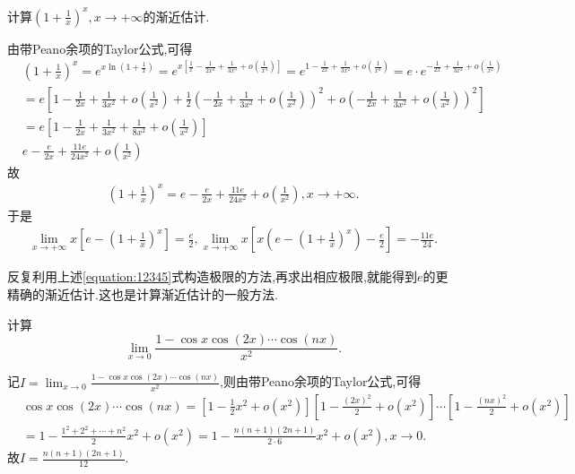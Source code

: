 \documentclass[../../main.tex]{subfiles}%
\begin{document}
\begin{example}
计算$(1+\frac{1}{x})^x,x\to+\infty$的渐近估计.
\end{example}
\begin{solution}

由带Peano余项的Taylor公式,可得
\begin{align*}
&\left( 1+\frac{1}{x} \right) ^x=e^{x\ln \left( 1+\frac{1}{x} \right)}=e^{x\left[ \frac{1}{x}-\frac{1}{2x^2}+\frac{1}{3x^3}+o\left( \frac{1}{x^3} \right) \right]}=e^{1-\frac{1}{2x}+\frac{1}{3x^2}+o\left( \frac{1}{x^2} \right)}=e\cdot e^{-\frac{1}{2x}+\frac{1}{3x^2}+o\left( \frac{1}{x^2} \right)}
\\
&=e\left[ 1-\frac{1}{2x}+\frac{1}{3x^2}+o\left( \frac{1}{x^2} \right) +\frac{1}{2}\left( -\frac{1}{2x}+\frac{1}{3x^2}+o\left( \frac{1}{x^2} \right) \right) ^2+o\left( -\frac{1}{2x}+\frac{1}{3x^2}+o\left( \frac{1}{x^2} \right) \right) ^2 \right] 
\\
&=e\left[ 1-\frac{1}{2x}+\frac{1}{3x^2}+\frac{1}{8x^2}+o\left( \frac{1}{x^2} \right) \right] 
\\
&e-\frac{e}{2x}+\frac{11e}{24x^2}+o\left( \frac{1}{x^2} \right) 
\end{align*}
故\begin{align*}
\left( 1+\frac{1}{x} \right) ^x=e-\frac{e}{2x}+\frac{11e}{24x^2}+o\left( \frac{1}{x^2} \right) ,x\rightarrow +\infty .
\end{align*}
于是
\begin{align}\label{equation:12345}
\underset{x\rightarrow +\infty}{\lim}x\left[ e-\left( 1+\frac{1}{x} \right) ^x \right] =\frac{e}{2},\underset{x\rightarrow +\infty}{\lim}x\left[ x\left( e-\left( 1+\frac{1}{x} \right) ^x \right) -\frac{e}{2} \right] =-\frac{11e}{24}.
\end{align}

\end{solution}
\begin{remark}
反复利用上述\eqref{equation:12345}式构造极限的方法,再求出相应极限,就能得到$e$的更精确的渐近估计.这也是计算渐近估计的一般方法.
\end{remark}

\begin{example}
计算
\[
\lim_{x \to 0} \frac{1 - \cos x \cos(2x) \cdots \cos(nx)}{x^2}.
\]
\end{example}
\begin{solution}

记$I=\lim_{x \to 0} \frac{1 - \cos x \cos(2x) \cdots \cos(nx)}{x^2}$,则由带Peano余项的Taylor公式,可得
\begin{align*}
&\cos x \cos(2x) \cdots \cos(nx)
=\left[1 - \frac{1}{2}x^2 + o(x^2)\right]\left[1 - \frac{(2x)^2}{2} + o(x^2)\right] \cdots \left[1 - \frac{(nx)^2}{2} + o(x^2)\right]
\\
&= 1 - \frac{1^2 + 2^2 + \cdots + n^2}{2}x^2 + o(x^2)
= 1 - \frac{n(n + 1)(2n + 1)}{2 \cdot 6}x^2 + o(x^2),x\to0.
\end{align*}
故\(I = \frac{n(n + 1)(2n + 1)}{12}\).

\end{solution}
\end{document}
